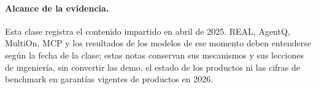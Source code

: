 \documentclass[a4paper]{article}
\begin{document}
\paragraph{Alcance de la evidencia.}
Esta clase registra el contenido impartido en abril de 2025. REAL, AgentQ, MultiOn, MCP y los resultados de los modelos de ese momento deben entenderse según la fecha de la clase; estas notas conservan sus mecanismos y sus lecciones de ingeniería, sin convertir las demo, el estado de los productos ni las cifras de benchmark en garantías vigentes de productos en 2026.
\end{document}
